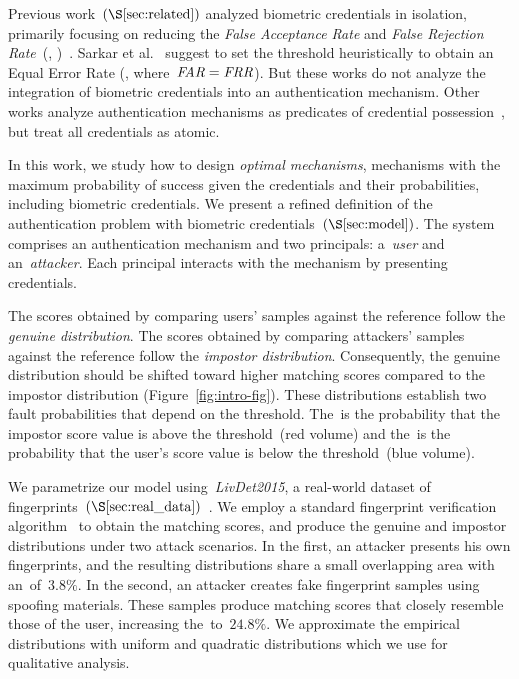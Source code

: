 \documentclass[conference,compsoc]{IEEEtran}
\begin{document}
Previous work~$(\S\ref{sec:related})$ analyzed biometric credentials in isolation, primarily focusing on reducing the \emph{False Acceptance Rate} and \emph{False Rejection Rate}~(\FAR, \FRR)~\cite{Anil1997,prabhakar2003,Cappelli2006}. Sarkar et al.~\cite{sarkar2020} suggest to set the threshold heuristically to obtain an Equal Error Rate (\EER, where~$\textit{FAR} = \textit{FRR}$). But these works do not analyze the integration of biometric credentials into an authentication mechanism. Other works analyze authentication mechanisms as predicates of credential possession~\cite{maram2024,mouallem2024,Eyal2021,Abhishek2013}, but treat all credentials as atomic. 

In this work, we study how to design \emph{optimal mechanisms}, mechanisms with the maximum probability of success given the credentials and their probabilities, including biometric credentials. We present a refined definition of the authentication problem with biometric credentials~$(\S\ref{sec:model})$. The system comprises an authentication mechanism and two principals: a~\emph{user} and an~\emph{attacker}. Each principal interacts with the mechanism by presenting credentials.

The scores obtained by comparing users' samples against the reference follow the \emph{genuine distribution}. The scores obtained by comparing attackers' samples against the reference follow the \emph{impostor distribution}. Consequently, the genuine distribution should be shifted toward higher matching scores compared to the impostor distribution (Figure~\ref{fig:intro-fig}). These distributions establish two fault probabilities that depend on the threshold. The~\FAR is the probability that the impostor score value is above the threshold~(red volume) and the~\FRR is the probability that the user's score value is below the threshold~(blue volume).

We parametrize our model using~\textit{LivDet2015}, a real-world dataset of fingerprints~$(\S\ref{sec:real_data})$~\cite{LivDet2015,LivDet2013,LivDet2011,LivDet2009}. We employ a standard fingerprint verification algorithm~\cite{sourceafis} to obtain the matching scores, and produce the genuine and impostor distributions under two attack scenarios. In the first, an attacker presents his own fingerprints, and the resulting distributions share a small overlapping area with an~\EER of~$3.8\%$. In the second, an attacker creates fake fingerprint samples using spoofing materials. These samples produce matching scores that closely resemble those of the user, increasing the~\EER to~$24.8\%$. We approximate the empirical distributions with uniform and quadratic distributions which we use for qualitative analysis.
\end{document}
